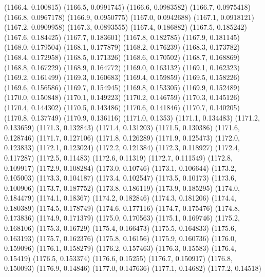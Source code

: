 {					(1166.4, 0.100815)
					(1166.5, 0.0991745)
					(1166.6, 0.0983582)
					(1166.7, 0.0975418)
					(1166.8, 0.0967178)
					(1166.9, 0.0950775)
					(1167.0, 0.0942688)
					(1167.1, 0.0918121)
					(1167.2, 0.0909958)
					(1167.3, 0.0893555)
					(1167.4, 0.186882)
					(1167.5, 0.185242)
					(1167.6, 0.184425)
					(1167.7, 0.183601)
					(1167.8, 0.182785)
					(1167.9, 0.181145)
					(1168.0, 0.179504)
					(1168.1, 0.177879)
					(1168.2, 0.176239)
					(1168.3, 0.173782)
					(1168.4, 0.172958)
					(1168.5, 0.171326)
					(1168.6, 0.170502)
					(1168.7, 0.168869)
					(1168.8, 0.167229)
					(1168.9, 0.164772)
					(1169.0, 0.163132)
					(1169.1, 0.162323)
					(1169.2, 0.161499)
					(1169.3, 0.160683)
					(1169.4, 0.159859)
					(1169.5, 0.158226)
					(1169.6, 0.156586)
					(1169.7, 0.154945)
					(1169.8, 0.153305)
					(1169.9, 0.152489)
					(1170.0, 0.150848)
					(1170.1, 0.149223)
					(1170.2, 0.146759)
					(1170.3, 0.145126)
					(1170.4, 0.144302)
					(1170.5, 0.143486)
					(1170.6, 0.141846)
					(1170.7, 0.140205)
					(1170.8, 0.137749)
					(1170.9, 0.136116)
					(1171.0, 0.1353)
					(1171.1, 0.134483)
					(1171.2, 0.133659)
					(1171.3, 0.132843)
					(1171.4, 0.131203)
					(1171.5, 0.130386)
					(1171.6, 0.128746)
					(1171.7, 0.127106)
					(1171.8, 0.126289)
					(1171.9, 0.125473)
					(1172.0, 0.123833)
					(1172.1, 0.123024)
					(1172.2, 0.121384)
					(1172.3, 0.118927)
					(1172.4, 0.117287)
					(1172.5, 0.11483)
					(1172.6, 0.11319)
					(1172.7, 0.111549)
					(1172.8, 0.109917)
					(1172.9, 0.108284)
					(1173.0, 0.10746)
					(1173.1, 0.106644)
					(1173.2, 0.105003)
					(1173.3, 0.104187)
					(1173.4, 0.102547)
					(1173.5, 0.10173)
					(1173.6, 0.100906)
					(1173.7, 0.187752)
					(1173.8, 0.186119)
					(1173.9, 0.185295)
					(1174.0, 0.184479)
					(1174.1, 0.18367)
					(1174.2, 0.182846)
					(1174.3, 0.181206)
					(1174.4, 0.180389)
					(1174.5, 0.178749)
					(1174.6, 0.177116)
					(1174.7, 0.175476)
					(1174.8, 0.173836)
					(1174.9, 0.171379)
					(1175.0, 0.170563)
					(1175.1, 0.169746)
					(1175.2, 0.168106)
					(1175.3, 0.16729)
					(1175.4, 0.166473)
					(1175.5, 0.164833)
					(1175.6, 0.163193)
					(1175.7, 0.162376)
					(1175.8, 0.16156)
					(1175.9, 0.160736)
					(1176.0, 0.159096)
					(1176.1, 0.158279)
					(1176.2, 0.157463)
					(1176.3, 0.15583)
					(1176.4, 0.15419)
					(1176.5, 0.153374)
					(1176.6, 0.15255)
					(1176.7, 0.150917)
					(1176.8, 0.150093)
					(1176.9, 0.14846)
					(1177.0, 0.147636)
					(1177.1, 0.14682)
					(1177.2, 0.14518)
}
